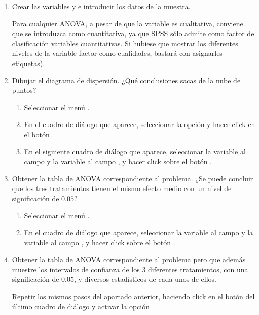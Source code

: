 \begin{enumerate}[leftmargin=*]
\begin{enumerate}
\item Crear las variables  y  e introducir los datos de la muestra.
\begin{indicacion}
Para cualquier ANOVA, a pesar de que la variable  es cualitativa, conviene que se introduzca como cuantitativa, ya que
SPSS sólo admite como factor de clasificación variables cuantitativas. Si hubiese que mostrar los diferentes niveles de la variable factor
como cualidades, bastará con asignarles etiquetas).
\end{indicacion}

\item Dibujar el diagrama de dispersión. ¿Qué conclusiones sacas de la nube de puntos?
\begin{indicacion}
\begin{enumerate}
\item Seleccionar el menú .
\item En el cuadro de diálogo que aparece, seleccionar la opción 
y hacer click en el botón .
\item En el siguiente cuadro de diálogo que aparece, seleccionar la variable
 al campo  y la variable  al
campo , y hacer click sobre el botón .
\end{enumerate}
\end{indicacion}

\item Obtener la tabla de ANOVA correspondiente al problema. ¿Se puede concluir que los tres tratamientos tienen el mismo efecto medio con
un nivel de significación de $0.05$?
\begin{indicacion}
\begin{enumerate}
\item Seleccionar el menú .
\item En el cuadro de diálogo que aparece, seleccionar la variable
 al campo  y la variable
 al campo , y hacer click sobre el botón
.
\end{enumerate}
\end{indicacion}

\item Obtener la tabla de ANOVA correspondiente al problema pero que además muestre los intervalos de confianza de los 3 diferentes
tratamientos, con una significación de $0.05$, y diversos estadísticos de cada unos de ellos.
\begin{indicacion}
Repetir los mismos pasos del apartado anterior, haciendo click en el botón  del último cuadro de
diálogo y activar la opción .
\end{indicacion}



\end{enumerate}
\end{enumerate}
